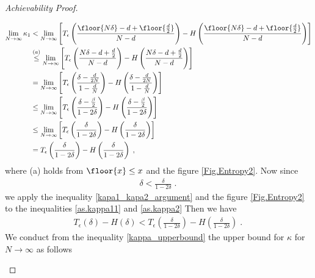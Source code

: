 \begin{proof}[Achievability Proof]
\begin{itemize}
\begin{enumerate}
\begin{align}
\label{as.kappa11}
     \lim_{N\to\infty} \kappa_1 &< \lim_{N\to\infty} \left[T_\epsilon\left(\frac{\floor{N\delta}-d+\floor{\frac{d}{2}}}{N-d}\textbf{}\right)-H\left(\frac{\floor{N\delta}-d+\floor{\frac{d}{2}}}{N-d}\right)\right]
     \nonumber \\
     &\stackrel{(a)}{\leq} \lim_{N\to\infty} \left[T_\epsilon\left(\frac{N\delta-d+\frac{d}{2}}{N-d}\right) - H\left(\frac{N\delta-d+\frac{d}{2}}{N-d}\right)\right]
     \nonumber \\
     & = \lim_{N\to\infty} \left[T_\epsilon\left(\frac{\delta-\frac{d}{2 N}}{1-\frac{d}{N}}\textbf{}\right)-H\left(\frac{\delta-\frac{d}{2 N}}{1-\frac{d}{N}}\textbf{}\right)\right]
     \nonumber \\
     & \leq \lim_{N\to\infty} \left[T_\epsilon\left(\frac{\delta - \frac{\beta}{2}}{1-2\delta}\right)-H\left(\frac{\delta - \frac{\beta}{2}}{1-2\delta}\right)\right]
     \nonumber \\
     & \leq \lim_{N\to\infty} \left[T_\epsilon\left(\frac{\delta }{1-2\delta}\right) - H\left(\frac{\delta }{1-2\delta}\right) \right]
     \nonumber \\
     & = T_\epsilon\left(\frac{\delta }{1-2\delta}\right) - H\left(\frac{\delta }{1-2\delta}\right) 
     \;,\,
\end{align}
where (a) holds from $\floor{x}\leq x$ and the figure \eqref{Fig.Entropy2}.
Now since 
    \begin{align}
       \label{kapa1_kapa2_argument}
       \delta < \frac{\delta }{1-2\delta} \;.\,
    \end{align}
we apply the inequality \eqref{kapa1_kapa2_argument} and the figure \eqref{Fig.Entropy2} to the inequalities   \eqref{as.kappa11} and \eqref{as.kappa2} Then we have 
    \begin{align}
    \label{kappa_upperbound}
     T_\epsilon\left(\delta\right) - H\left(\delta\right)  < T_\epsilon\left(\frac{\delta }{1-2\delta}\right) - H\left(\frac{\delta }{1-2\delta}\right)  \;.\,
    \end{align} 
We conduct from the inequality \eqref{kappa_upperbound} the upper bound for $\kappa$ for $N \to \infty$ as follows

\end{enumerate}
\end{itemize}
\end{proof}
